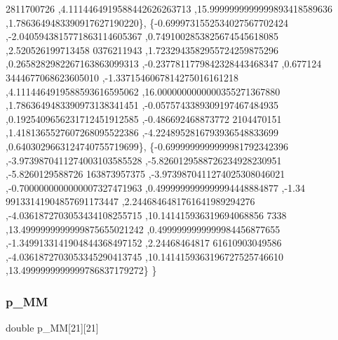 \begin{DoxyCode}
      2811700726 ,4.1114464919588442626263713 ,15.9999999999999893418589636 ,1.7863649483390917627190220\},
\{-0.6999731552534027567702424 ,-2.0405943815771863114605367 ,0.7491002853825674545618085 ,2.520526199713458
      0376211943 ,1.7232943582955724259875296 ,0.2658282982267163863099313 ,-0.2377811779842328443468347 ,0.677124
      3444677068623605010 ,-1.3371546067814275016161218 ,4.1114464919588593616595062 ,16.0000000000000355271367880
       ,1.7863649483390973138341451 ,-0.0575743389309197467484935 ,0.1925409656231712451912585 ,-0.486692468873772
      2104470151 ,1.4181365527607268095522386 ,-4.2248952816793936548833699 ,0.6403029663124740755719699\},
\{-0.6999999999999981792342396 ,-3.9739870411274003103585528 ,-5.8260129588726234928230951 ,-5.8260129588726
      163873957375 ,-3.9739870411274025308046021 ,-0.7000000000000007327471963 ,0.4999999999999994448884877 ,-1.34
      99133141904857691173447 ,2.2446846481761641989294276 ,-4.0361872703053434108255715 ,10.141415936319694068856
      7338 ,13.4999999999999875655021242 ,0.4999999999999984456877655 ,-1.3499133141904844368497152 ,2.24468464817
      61610903049586 ,-4.0361872703053345290413745 ,10.1414159363196727525746610 ,13.4999999999999786837179272\}
\}
\end{DoxyCode}
\mbox{\label{a00458_ae32ef8c2978cfffc40f3d0b8748aec90}} 
\subsubsection{\texorpdfstring{p\+\_\+\+MM}{p\_MM}}
{\footnotesize\ttfamily double p\+\_\+\+MM\mbox{[}21\mbox{]}\mbox{[}21\mbox{]}}

